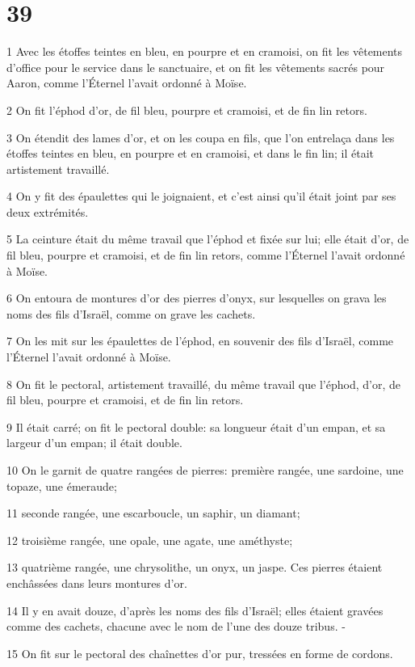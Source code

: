 \chapter{39}

\par 1 Avec les étoffes teintes en bleu, en pourpre et en cramoisi, on fit les vêtements d'office pour le service dans le sanctuaire, et on fit les vêtements sacrés pour Aaron, comme l'Éternel l'avait ordonné à Moïse.
\par 2 On fit l'éphod d'or, de fil bleu, pourpre et cramoisi, et de fin lin retors.
\par 3 On étendit des lames d'or, et on les coupa en fils, que l'on entrelaça dans les étoffes teintes en bleu, en pourpre et en cramoisi, et dans le fin lin; il était artistement travaillé.
\par 4 On y fit des épaulettes qui le joignaient, et c'est ainsi qu'il était joint par ses deux extrémités.
\par 5 La ceinture était du même travail que l'éphod et fixée sur lui; elle était d'or, de fil bleu, pourpre et cramoisi, et de fin lin retors, comme l'Éternel l'avait ordonné à Moïse.
\par 6 On entoura de montures d'or des pierres d'onyx, sur lesquelles on grava les noms des fils d'Israël, comme on grave les cachets.
\par 7 On les mit sur les épaulettes de l'éphod, en souvenir des fils d'Israël, comme l'Éternel l'avait ordonné à Moïse.
\par 8 On fit le pectoral, artistement travaillé, du même travail que l'éphod, d'or, de fil bleu, pourpre et cramoisi, et de fin lin retors.
\par 9 Il était carré; on fit le pectoral double: sa longueur était d'un empan, et sa largeur d'un empan; il était double.
\par 10 On le garnit de quatre rangées de pierres: première rangée, une sardoine, une topaze, une émeraude;
\par 11 seconde rangée, une escarboucle, un saphir, un diamant;
\par 12 troisième rangée, une opale, une agate, une améthyste;
\par 13 quatrième rangée, une chrysolithe, un onyx, un jaspe. Ces pierres étaient enchâssées dans leurs montures d'or.
\par 14 Il y en avait douze, d'après les noms des fils d'Israël; elles étaient gravées comme des cachets, chacune avec le nom de l'une des douze tribus. -
\par 15 On fit sur le pectoral des chaînettes d'or pur, tressées en forme de cordons.
